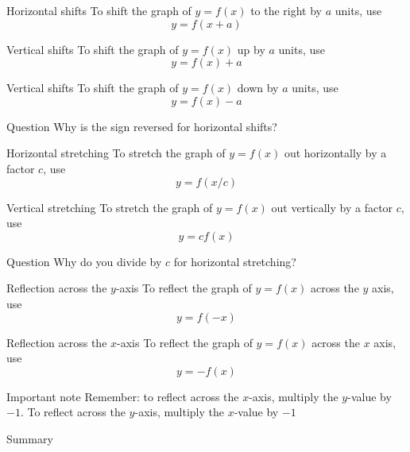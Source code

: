 \documentclass[t]{beamer}
\begin{document}
\begin{frame}{Horizontal shifts}
To shift the graph of $y = f(x)$ to the right by $a$ units, use
$$y = f(x + a)$$
\end{frame}

\begin{frame}{Vertical shifts}
To shift the graph of $y = f(x)$ up by $a$ units, use
$$y = f(x) +  a$$
\end{frame}

\begin{frame}{Vertical shifts}
To shift the graph of $y = f(x)$ down by $a$ units, use
$$y = f(x) - a$$
\end{frame}

\begin{frame}{Question}
Why is the sign reversed for horizontal shifts?
\end{frame}

\begin{frame}{Horizontal stretching}
To stretch the graph of $y = f(x)$ out horizontally by a factor $c$, use
$$y = f(x/c)$$
\end{frame}

\begin{frame}{Vertical stretching}
To stretch the graph of $y = f(x)$ out vertically by a factor $c$, use
$$y = cf(x)$$
\end{frame}

\begin{frame}{Question}
Why do you divide by $c$ for horizontal stretching?
\end{frame}

\begin{frame}{Reflection across the $y$-axis}
To reflect the graph of $y = f(x)$ across the $y$ axis, use
$$y = f(-x)$$
\end{frame}

\begin{frame}{Reflection across the $x$-axis}
To reflect the graph of $y = f(x)$ across the $x$ axis, use
$$y = -f(x)$$
\end{frame}

\begin{frame}{Important note}
Remember: to reflect across the $x$-axis, multiply the $y$-value by $-1$.
To reflect across the $y$-axis, multiply the $x$-value by $-1$
\end{frame}

\begin{frame}{Summary}
\end{frame}
\end{document}
